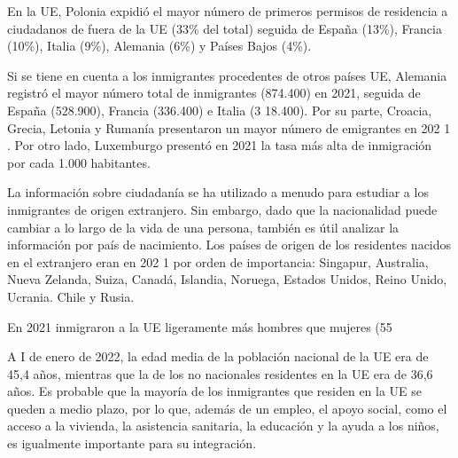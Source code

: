 \documentclass[10pt,a4paper]{article}
\begin{document}
En la UE, Polonia expidió el mayor número de primeros permisos de residencia a ciudadanos de fuera de la UE (33\% del total) seguida de España (13\%), Francia (10\%), Italia (9\%), Alemania (6\%) y Países Bajos (4\%).

Si se tiene en cuenta a los inmigrantes procedentes de otros países UE, Alemania registró el mayor número total de inmigrantes (874.400) en 2021, seguida de España (528.900), Francia (336.400) e Italia (3 18.400). Por su parte, Croacia, Grecia, Letonia y Rumanía presentaron un mayor número de emigrantes en 202 1 . Por otro lado, Luxemburgo presentó en 2021 la tasa más alta de inmigración por cada 1.000 habitantes.

La información sobre ciudadanía se ha utilizado a menudo para estudiar a los inmigrantes de origen extranjero. Sin embargo, dado que la nacionalidad puede cambiar a lo largo de la vida de una persona, también es útil analizar la información por país de nacimiento. Los países de origen de los residentes nacidos en el extranjero eran en 202 1 por orden de importancia: Singapur, Australia, Nueva Zelanda, Suiza, Canadá, Islandia, Noruega, Estados Unidos, Reino Unido, Ucrania. Chile y Rusia.

En 2021 inmigraron a la UE ligeramente más hombres que mujeres (55%

A I de enero de 2022, la edad media de la población nacional de la UE era de 45,4 años, mientras que la de los no nacionales residentes en la UE era de 36,6 años. Es probable que la mayoría de los inmigrantes que residen en la UE se queden a medio plazo, por lo que, además de un empleo, el apoyo social, como el acceso a la vivienda, la asistencia sanitaria, la educación y la ayuda a los niños, es igualmente importante para su integración.
\end{document}
